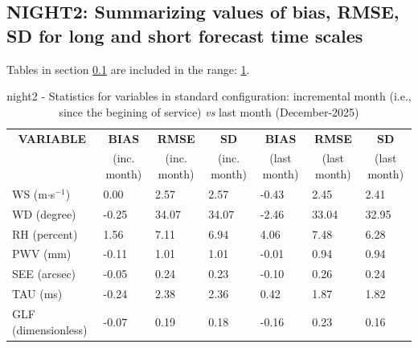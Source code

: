 \subsection{NIGHT2: Summarizing values of bias, RMSE, SD for long and short forecast time scales}\label{subsec:night2:stat}
Tables in section \ref{subsec:night2:stat} are included in the range: \ref{tab:night2:statBEF}.
\begin{table}[h!]
\begin{center}
\begin{tabular}{|l|l|l|l|l|l|l|}
\hline
\multicolumn{1}{|c|}{\cellcolor[HTML]{C0C0C0}\textbf{VARIABLE}} & \multicolumn{1}{c|}{\cellcolor[HTML]{C0C0C0}\textbf{BIAS}} & \multicolumn{1}{c|}{\cellcolor[HTML]{C0C0C0}\textbf{RMSE}} & \multicolumn{1}{c|}{\cellcolor[HTML]{C0C0C0}\textbf{SD}} & \multicolumn{1}{c|}{\cellcolor[HTML]{C0C0C0}\textbf{BIAS}} & \multicolumn{1}{c|}{\cellcolor[HTML]{C0C0C0}\textbf{RMSE}} & \multicolumn{1}{c|}{\cellcolor[HTML]{C0C0C0}\textbf{SD}}\\
\multicolumn{1}{|c|}{\cellcolor[HTML]{C0C0C0}} & \multicolumn{1}{c|}{\cellcolor[HTML]{C0C0C0}(inc. month)} & \multicolumn{1}{c|}{\cellcolor[HTML]{C0C0C0}(inc. month)} & \multicolumn{1}{c|}{\cellcolor[HTML]{C0C0C0}(inc. month)} & \multicolumn{1}{c|}{\cellcolor[HTML]{C0C0C0}(last month)} & \multicolumn{1}{c|}{\cellcolor[HTML]{C0C0C0}(last month)} & \multicolumn{1}{c|}{\cellcolor[HTML]{C0C0C0}(last month)}\\\hline
\cellcolor[HTML]{C0C0C0}WS (m$\cdot$s$^{-1}$) &      0.00  &      2.57  &      2.57  &     -0.43     &      2.45     &      2.41\\
\cellcolor[HTML]{C0C0C0}WD (degree)           &     -0.25  &     34.07  &     34.07  &     -2.46     &     33.04     &     32.95\\
\cellcolor[HTML]{C0C0C0}RH (percent)          &      1.56  &      7.11  &      6.94  &      4.06     &      7.48     &      6.28\\
\cellcolor[HTML]{C0C0C0}PWV (mm)              &     -0.11 &      1.01 &      1.01 &     -0.01    &      0.94    &      0.94\\
\cellcolor[HTML]{C0C0C0}SEE (arcsec)          &     -0.05 &      0.24 &      0.23 &     -0.10    &      0.26    &      0.24\\
\cellcolor[HTML]{C0C0C0}TAU (ms)              &     -0.24 &      2.38 &      2.36 &      0.42    &      1.87    &      1.82\\
\cellcolor[HTML]{C0C0C0}GLF (dimensionless)   &     -0.07 &      0.19 &      0.18 &     -0.16    &      0.23    &      0.16\\
\hline
\end{tabular}
\caption{night2 - Statistics for variables in standard configuration: incremental month (i.e., since the begining of service) \textit{vs} last month (December-2025)}\label{tab:night2:statBEF}
\end{center}
\end{table}

